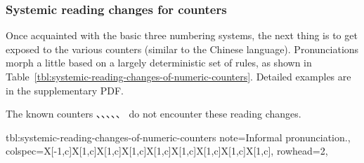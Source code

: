 \documentclass[../nihongo-gakushuu-kyouzai.tex]{subfiles}
\begin{document}
\subsubsection{Systemic reading changes for counters} \label{sec:systemic-reading-changes-for-counters}
Once acquainted with the basic three numbering systems, the next thing is to get exposed to the various counters (similar to the Chinese language). Pronunciations morph a little based on a largely deterministic set of rules, as shown in Table~\ref{tbl:systemic-reading-changes-of-numeric-counters}. Detailed examples are in the supplementary PDF.

The known counters 、、、、、 do not encounter these reading changes.

{tbl:systemic-reading-changes-of-numeric-counters}  %
{
    note{\dagger}={Informal pronunciation.},
}  %
{
    colspec={X[-1,c]X[1,c]X[1,c]X[1,c]X[1,c]X[1,c]X[1,c]X[1,c]X[1,c]},
    rowhead=2,
}  %
\end{document}
